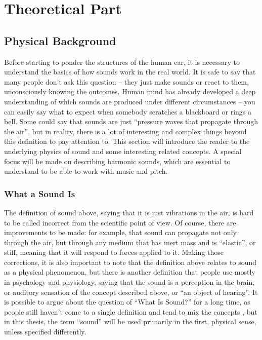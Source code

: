 \chapter{Theoretical Part}\label{chapter:theory}

\section{Physical Background}\label{chapter:physics}

Before starting to ponder the structures of the human ear, it is necessary to understand the basics of how sounds work in the real world. It is safe to say that many people don’t ask this question – they just make sounds or react to them, unconsciously knowing the outcomes. Human mind has already developed a deep understanding of which sounds are produced under different circumstances – you can easily say what to expect when somebody scratches a blackboard or rings a bell. Some could say that sounds are just “pressure waves that propagate through the air”, but in reality, there is a lot of interesting and complex things beyond this definition to pay attention to. This section will introduce the reader to the underlying physics of sound and some interesting related concepts. A special focus will be made on describing harmonic sounds, which are essential to understand to be able to work with music and pitch.

\subsection{What a Sound Is}\label{section:physics_sound}

The definition of sound above, saying that it is just vibrations in the air, is hard to be called incorrect from the scientific point of view. Of course, there are improvements to be made: for example, that sound can propagate not only through the air, but through any medium that has inert mass and is “elastic”, or stiff, meaning that it will respond to forces applied to it. Making those corrections, it is also important to note that the definition above relates to sound as a physical phenomenon, but there is another definition that people use mostly in psychology and physiology, saying that the sound is a perception in the brain, or auditory sensation of the concept described above, or “an object of hearing”. It is possible to argue about the question of “What Is Sound?” for a long time, as people still haven’t come to a single definition and tend to mix the concepts \cite{Pasnau1999}, but in this thesis, the term “sound” will be used primarily in the first, physical sense, unless specified differently.\\

